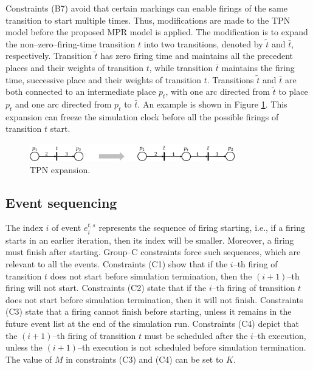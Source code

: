 \documentclass[suppldata]{interact}
\theoremstyle{plain}
\theoremstyle{definition}
\theoremstyle{remark}
\begin{document}
Constraints (B7) avoid that certain markings can enable firings of the same transition to start multiple times. Thus, modifications are made to the TPN model before the proposed MPR model is applied. The modification is to expand the non--zero--firing-time transition $t$ into two transitions, denoted by $\tilde{t}$ and $\bar{t}$, respectively. Transition $\tilde{t}$ has zero firing time and maintains all the precedent places and their weights of transition $t$, while transition $\bar{t}$ maintains the firing time, successive place and their weights of transition $t$. Transitions $\tilde{t}$ and $\bar{t}$ are both connected to an intermediate place $p_t$, %
with one arc %
directed from $\tilde{t}$ to place $p_t$ and one arc %
directed from $p_t$ to $\bar{t}$. An example is shown in Figure \ref{fig:tpn_expansion}. This expansion can freeze the simulation clock before all the possible firings of transition $t$ start.

\begin{figure}[h]
	\centering
	\includegraphics[width=0.8\textwidth]{Figures/TPN_expansion.png}
	\caption{TPN expansion.}
	\label{fig:tpn_expansion}
\end{figure}


\subsection{Event sequencing}
The index $i$ of event $e^{t,s}_i$ represents the sequence of firing starting, i.e., if a firing starts in an earlier iteration, then its index will be smaller. Moreover, a firing must finish after starting. Group--C constraints force such sequences, which are relevant to all the events. Constraints (C1) show that if the $i$--th firing of transition $t$ does not start before simulation termination, then the $(i+1)$--th firing will not start. Constraints (C2) state that if the $i$--th firing of transition $t$ does not start before simulation termination, then it will not finish. Constraints (C3) state that a firing cannot finish before starting, unless it remains in the future event list at the end of the simulation run. Constraints (C4) depict that the $(i+1)$--th firing of transition $t$ must be scheduled after the $i$--th execution, unless the $(i+1)$--th execution is not scheduled before simulation termination. The value of $M$ in constraints (C3) and (C4) can be set to $K$. 
\end{document}
